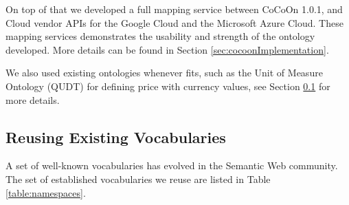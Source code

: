 On top of that we developed a full mapping service between CoCoOn 1.0.1, and Cloud vendor APIs for the Google Cloud and the Microsoft Azure Cloud.
These mapping services demonstrates the usability and strength of the ontology developed. More details can be found in Section \ref{sec:cocoonImplementation}.

We also used existing ontologies whenever fits, such as 
the Unit of Measure Ontology (QUDT) \cite{OntologyUnitsOfMeasure} for defining price with currency values, see Section \ref{sec:ReusingExistingVocabularies} for more details.

\subsection{Reusing Existing Vocabularies}
\label{sec:ReusingExistingVocabularies}
A set of well-known vocabularies has evolved in the Semantic Web community.
The set of established vocabularies we reuse are listed in Table \ref{table:namespaces}.

